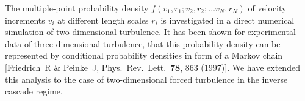 The multiple-point probability density $f(v_1, r_1; v_2, r_2; \dots v_N, r_N)$ of velocity increments $v_i$ at different length scales $r_i$ is investigated in a direct numerical simulation of two-dimensional turbulence.
It has been shown for experimental data of three-dimensional turbulence, that this probability density can be represented by conditional probability densities in form of a Markov chain [Friedrich~R \& Peinke~J, Phys.~Rev.~Lett.~\textbf{78}, 863 (1997)].
We have extended this analysis to the case of two-dimensional forced turbulence in the inverse cascade regime.
